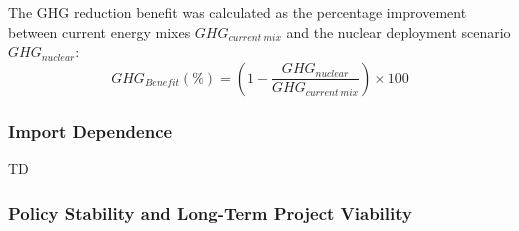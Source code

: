 The GHG reduction benefit was calculated as the percentage improvement between current energy mixes $GHG_{current\ mix}$  and the nuclear deployment scenario $GHG_{nuclear}$:
$$
GHG_{Benefit} (\%) = \left(1 - \frac{GHG_{nuclear}}{GHG_{current\ mix}}\right) \times 100
$$




\subsubsection{Import Dependence}
TD

\subsubsection{Policy Stability and Long-Term Project Viability}





